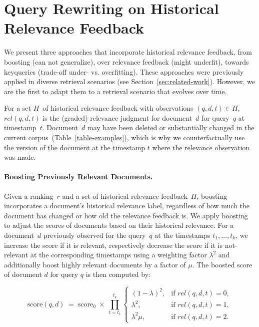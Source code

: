 \section{Query Rewriting on Historical Relevance Feedback}

We present three approaches that incorporate historical relevance feedback, from \Ni boosting (can not generalize), over \Nii relevance feedback (might underfit), towards \Niii keyqueries (trade-off under- vs. overfitting). These approaches were previously applied in diverse retrieval scenarios (see Section~\ref{sec:related-work}). However, we are the first to adapt them to a retrieval scenario that evolves over time.

For a set $H$~of historical relevance feedback with observations $(q, d, t) \in H$, $rel(q, d, t)$ is the (graded) relevance judgment for document~$d$ for query~$q$ at timestamp~$t$. Document~$d$ may have been deleted or substantially changed in the current corpus~(Table~\ref{table-examples}), which is why we counterfactually use the version of the document at the timestamp $t$ where the relevance observation was made.

\paragraph{Boosting Previously Relevant Documents.} Given a ranking~$r$ and a set of historical relevance feedback~$H$, boosting incorporates a document's historical relevance label, regardless of how much the document has changed or how old the relevance feedback is. We apply boosting to adjust the scores of documents based on their historical relevance. For a document~$d$ previously observed for the query~$q$ at the timestamps $t_{1}, \ldots, t_{k}$, we increase the score if it is relevant, respectively decrease the score if it is not-relevant at the corresponding timestamps using a weighting factor $\lambda^2$ and additionally boost highly relevant documents by a factor of $\mu$. The boosted score of document $d$ for query $q$ is then computed by:

\begin{equation}
    \text{score}(q,d) \; = \; \text{score}_0 \;\times \;
    \prod_{t = t_1}^{t_k}
    \begin{cases}
        (1 - \lambda)^2, & \text{if } rel(q,d,t) = 0, \\
        \lambda^2, & \text{if } rel(q,d,t) = 1, \\
        \lambda^2  \mu, & \text{if } rel(q,d,t) = 2.
        \end{cases}
\end{equation}
    
